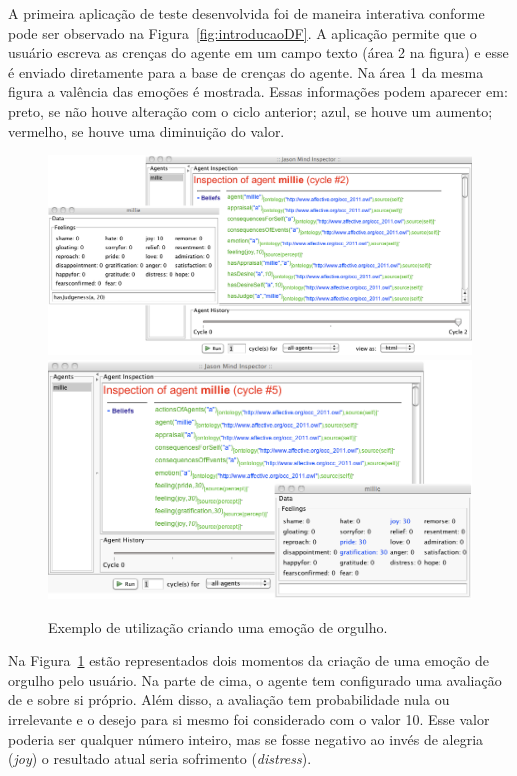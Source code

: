 A primeira aplicação de teste desenvolvida foi de maneira interativa conforme
pode ser observado na Figura~\ref{fig:introducaoDF}. A aplicação permite que o
usuário escreva as crenças do agente em um campo texto (área 2 na figura) e
esse é enviado diretamente para a base de crenças do agente. Na área 1 da mesma
figura a valência das emoções é mostrada.
Essas informações podem aparecer em: preto, se não houve alteração com o ciclo
anterior; azul, se houve um aumento; vermelho, se houve uma diminuição do
valor.

\begin{figure}
	\begin{center}
		\includegraphics[width=150mm]{figuras/beforeLastInsertionOfPride.png}
		\includegraphics[width=150mm]{figuras/afterLastInsertionOfPride.png}
	\end{center}
	\caption{Exemplo de utilização criando uma emoção de orgulho.}
	\label{fig:testeJasonIntBase}
\end{figure}

Na Figura~\ref{fig:testeJasonIntBase} estão representados dois momentos da
criação de uma emoção de orgulho pelo usuário. Na parte de cima, o
agente tem configurado uma avaliação de e sobre si próprio. Além disso, a
avaliação tem probabilidade nula ou irrelevante e o desejo para si mesmo foi
considerado com o valor 10. Esse valor poderia ser qualquer número inteiro,
mas se fosse negativo ao invés de alegria (\emph{joy}) o resultado atual seria
sofrimento (\emph{distress}).

